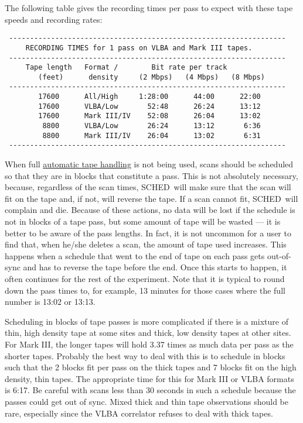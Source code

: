 \documentclass{report}
\newcommand{\schedb}{{\sc SCHED~}}
\begin{document}
The following table gives the recording times per pass to expect with
these tape speeds and recording rates:

\begin{verbatim}
 ------------------------------------------------------------------
     RECORDING TIMES for 1 pass on VLBA and Mark III tapes.
 ------------------------------------------------------------------
     Tape length   Format /        Bit rate per track
        (feet)      density     (2 Mbps)   (4 Mbps)   (8 Mbps)
 ------------------------------------------------------------------
        17600      All/High     1:28:00      44:00      22:00
        17600      VLBA/Low       52:48      26:24      13:12
        17600      Mark III/IV    52:08      26:04      13:02
         8800      VLBA/Low       26:24      13:12       6:36
         8800      Mark III/IV    26:04      13:02       6:31
 ------------------------------------------------------------------
\end{verbatim}


When full 
{\hyperref[SSSEC:AUTOTAPE]{automatic tape handling}} is not
being used, scans should be scheduled so that they are in blocks that
constitute a pass.  This is not absolutely necessary, because,
regardless of the scan times, \schedb will make sure that the scan
will fit on the tape and, if not, will reverse the tape.  If a scan
cannot fit, \schedb will complain and die.  Because of these actions,
no data will be lost if the schedule is not in blocks of a tape pass,
but some amount of tape will be wasted --- it is better to be aware of
the pass lengths.  In fact, it is not uncommon for a user to find that,
when he/she deletes a scan, the amount of tape used increases.  This
happens when a schedule that went to the end of tape on each pass
gets out-of-sync and has to reverse the tape before the end.  Once this
starts to happen, it often continues for the rest of the experiment.
Note that it is typical to round down the pass times to, for
example, 13 minutes for those cases where the full number is 13:02 or
13:13.

Scheduling in blocks of tape passes is more complicated if there is a
mixture of thin, high density tape at some sites and thick, low
density tapes at other sites.  For Mark III, the longer tapes will
hold 3.37 times as much data per pass as the shorter tapes.  Probably
the best way to deal with this is to schedule in blocks such that the
2 blocks fit per pass on the thick tapes and 7 blocks fit on the high
density, thin tapes.  The appropriate time for this for Mark III or
VLBA formats is 6:17.  Be careful with scans less than 30 seconds in
such a schedule because the passes could get out of sync.  Mixed
thick and thin tape observations should be rare, especially since
the VLBA correlator refuses to deal with thick tapes.
\end{document}
